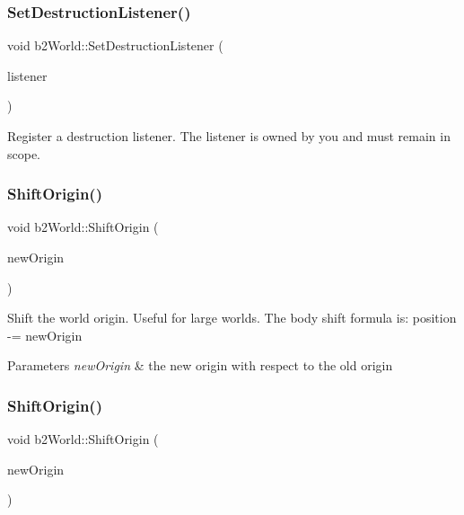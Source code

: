 \subsubsection{\texorpdfstring{Set\+Destruction\+Listener()}{SetDestructionListener()}\hspace{0.1cm}{\footnotesize\ttfamily [2/2]}}
{\footnotesize\ttfamily void b2\+World\+::\+Set\+Destruction\+Listener (\begin{DoxyParamCaption}\item[{\hyperlink{classb2DestructionListener}{b2\+Destruction\+Listener} $\ast$}]{listener }\end{DoxyParamCaption})}

Register a destruction listener. The listener is owned by you and must remain in scope. \mbox{\label{classb2World_afc33e20e64252c5be115216051408047}} 
\subsubsection{\texorpdfstring{Shift\+Origin()}{ShiftOrigin()}\hspace{0.1cm}{\footnotesize\ttfamily [1/2]}}
{\footnotesize\ttfamily void b2\+World\+::\+Shift\+Origin (\begin{DoxyParamCaption}\item[{const \hyperlink{structb2Vec2}{b2\+Vec2} \&}]{new\+Origin }\end{DoxyParamCaption})}

Shift the world origin. Useful for large worlds. The body shift formula is\+: position -\/= new\+Origin 
\begin{DoxyParams}{Parameters}
{\em new\+Origin} & the new origin with respect to the old origin \\
\hline
\end{DoxyParams}
\mbox{\label{classb2World_afc33e20e64252c5be115216051408047}} 
\subsubsection{\texorpdfstring{Shift\+Origin()}{ShiftOrigin()}\hspace{0.1cm}{\footnotesize\ttfamily [2/2]}}
{\footnotesize\ttfamily void b2\+World\+::\+Shift\+Origin (\begin{DoxyParamCaption}\item[{const \hyperlink{structb2Vec2}{b2\+Vec2} \&}]{new\+Origin }\end{DoxyParamCaption})}

